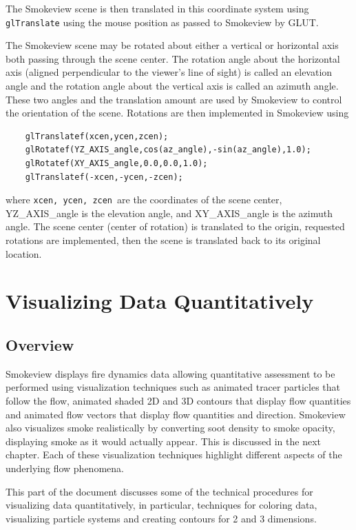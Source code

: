 \documentclass[11pt,twoside]{book}
\begin{document}
The Smokeview scene is then translated in this coordinate system using {\tt glTranslate}
using the mouse position as passed to Smokeview by GLUT.

The Smokeview scene may be rotated about either a vertical or horizontal axis both passing through the scene center.  The rotation angle about the horizontal axis (aligned perpendicular to the viewer's line of sight) is called an elevation angle and the rotation angle about the vertical axis is called an azimuth angle.
These two angles and the translation amount are used by Smokeview to control the orientation of the scene.   Rotations are then implemented in Smokeview using
\begin{verbatim}
    glTranslatef(xcen,ycen,zcen);
    glRotatef(YZ_AXIS_angle,cos(az_angle),-sin(az_angle),1.0);
    glRotatef(XY_AXIS_angle,0.0,0.0,1.0);
    glTranslatef(-xcen,-ycen,-zcen);
\end{verbatim}
where {\tt xcen, ycen, zcen}\ are the coordinates of the scene center, YZ\_AXIS\_angle is the elevation angle, and XY\_AXIS\_angle is the azimuth angle.  The scene center (center of rotation) is translated to the origin, requested rotations are implemented, then the scene is translated back to its original location.

%
%
\part{Visualizing Data Quantitatively}

%
%

\chapter{Overview}
Smokeview displays fire dynamics data allowing quantitative assessment to be performed using
visualization techniques such as animated tracer
particles that follow the flow, animated shaded 2D and 3D contours
that display flow quantities and animated flow vectors that
display flow quantities and direction. Smokeview also visualizes
smoke realistically by converting soot density to smoke opacity,
displaying smoke as it would actually appear. This is discussed in the next chapter.
Each of these visualization
techniques highlight different aspects of the underlying flow
phenomena.

This part of the document discusses some of the technical procedures for visualizing data quantitatively, in particular, techniques for coloring data, visualizing particle systems and creating contours for 2 and 3 dimensions.
\end{document}
